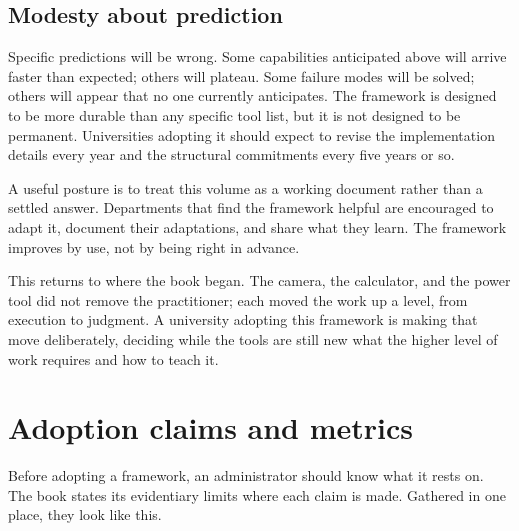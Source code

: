 \documentclass{SIAMbook2023}
\begin{document}
\subsection{Modesty about prediction}
\label{u:subsec:modesty}

Specific predictions will be wrong. Some capabilities anticipated above will arrive faster than expected; others will plateau. Some failure modes will be solved; others will appear that no one currently anticipates. The framework is designed to be more durable than any specific tool list, but it is not designed to be permanent. Universities adopting it should expect to revise the implementation details every year and the structural commitments every five years or so.

A useful posture is to treat this volume as a working document rather than a settled answer. Departments that find the framework helpful are encouraged to adapt it, document their adaptations, and share what they learn. The framework improves by use, not by being right in advance.

This returns to where the book began. The camera, the calculator, and the power tool did not remove the practitioner; each moved the work up a level, from execution to judgment. A university adopting this framework is making that move deliberately, deciding while the tools are still new what the higher level of work requires and how to teach it.

\section{Adoption claims and metrics}
\label{u:sec:metrics}%

Before adopting a framework, an administrator should know what it rests on. The book states its
evidentiary limits where each claim is made. Gathered in one place, they look like this.
\end{document}
